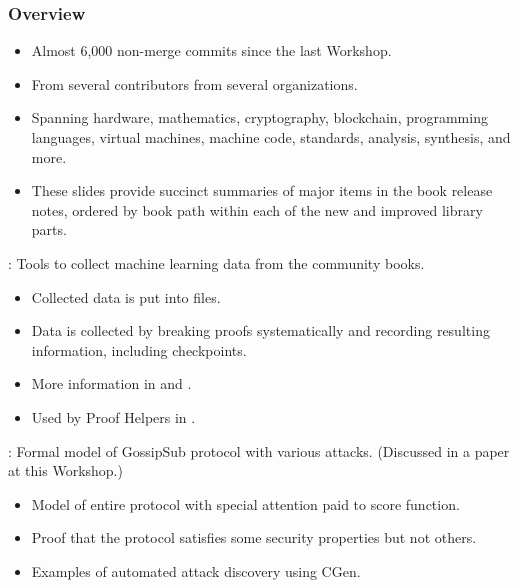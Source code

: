\begin{frame}

\frametitle{Overview}
      
\begin{itemize}
\item Almost 6,000 non-merge commits since the last Workshop.
\item From several contributors from several organizations.
\item Spanning hardware, mathematics, cryptography, blockchain,
      programming languages, virtual machines, machine code,
      standards, analysis, synthesis, and more.
\item These slides provide succinct summaries
      of major items in the book release notes,
      ordered by book path within each of the new and improved library parts.
\end{itemize}
      
\end{frame}


\begin{frame}

\newlibtitle

:
Tools to collect machine learning data from the community books.
\begin{itemize}
\item Collected data is put into  files.
\item Data is collected by breaking proofs systematically
      and recording resulting information, including checkpoints.
\item More information in  and  .
\item Used by Proof Helpers in .
\end{itemize}

\end{frame}


\begin{frame}

\newlibtitle

:
Formal model of GossipSub protocol with various attacks.
(Discussed in a paper at this Workshop.)
\begin{itemize}
\item Model of entire protocol with special attention paid to score function.
\item Proof that the protocol satisfies some security properties but not others.
\item Examples of automated attack discovery using CGen.
\end{itemize}

\end{frame}

